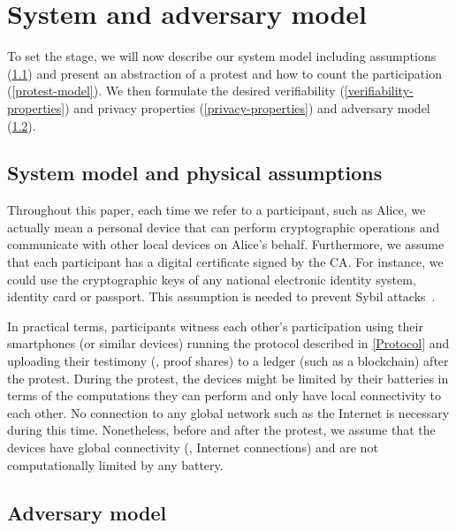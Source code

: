 \section{System and adversary model}%
\label{system-model}

To set the stage, we will now describe our system model including assumptions
(\cref{assumptions}) and present an abstraction of a protest and how to
count the participation (\cref{protest-model}). We then formulate the desired verifiability
(\cref{verifiability-properties}) and privacy properties
(\cref{privacy-properties}) and adversary model (\cref{adversary-model}).


\subsection{System model and physical assumptions}
\label{assumptions}

Throughout this paper, each time we refer to a participant, such as Alice, we actually mean a personal device that can perform cryptographic operations and communicate with other local devices on Alice's behalf. 
Furthermore, we assume that each participant has a digital certificate signed by the \ac{CA}.
For instance, we could use the cryptographic keys of any national electronic identity system, identity card or passport.
This assumption is needed to prevent Sybil attacks~\cite{SybilAttack}.

In practical terms, participants witness each other's participation
using their smartphones (or similar devices) running the protocol
described in \cref{Protocol} and uploading their testimony (\ie, proof
shares) to a ledger (such as a blockchain) after the protest. 
During the protest, the devices might be limited by their batteries in
terms of the computations they can perform and only have local connectivity to each other.
No connection to any global network such as the Internet is
necessary during this time.  
Nonetheless, before and after the protest, we assume that the devices have global connectivity (\ie, Internet connections) and are not computationally limited by any battery.





\subsection{Adversary model}
\label{adversary-model}
